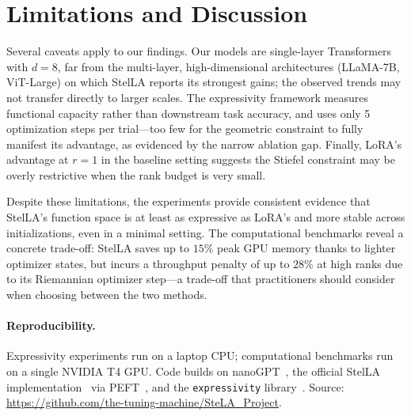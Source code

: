\documentclass[11pt, a4paper]{article}
\begin{document}
\section{Limitations and Discussion}

Several caveats apply to our findings. Our models are single-layer Transformers with $d{=}8$, far from the multi-layer, high-dimensional architectures (LLaMA-7B, ViT-Large) on which StelLA reports its strongest gains; the observed trends may not transfer directly to larger scales. The expressivity framework measures functional capacity rather than downstream task accuracy, and uses only 5 optimization steps per trial---too few for the geometric constraint to fully manifest its advantage, as evidenced by the narrow ablation gap. Finally, LoRA's advantage at $r{=}1$ in the baseline setting suggests the Stiefel constraint may be overly restrictive when the rank budget is very small.

Despite these limitations, the experiments provide consistent evidence that StelLA's function space is at least as expressive as LoRA's and more stable across initializations, even in a minimal setting. The computational benchmarks reveal a concrete trade-off: StelLA saves up to $15\%$ peak GPU memory thanks to lighter optimizer states, but incurs a throughput penalty of up to $28\%$ at high ranks due to its Riemannian optimizer step---a trade-off that practitioners should consider when choosing between the two methods.

\paragraph{Reproducibility.} Expressivity experiments run on a laptop CPU; computational benchmarks run on a single NVIDIA T4 GPU. Code builds on nanoGPT~\cite{nanogpt}, the official StelLA implementation~\cite{stella_code} via PEFT~\cite{peft}, and the \texttt{expressivity} library~\cite{expressivity}. Source: \url{https://github.com/the-tuning-machine/SteLA_Project}.
\end{document}
